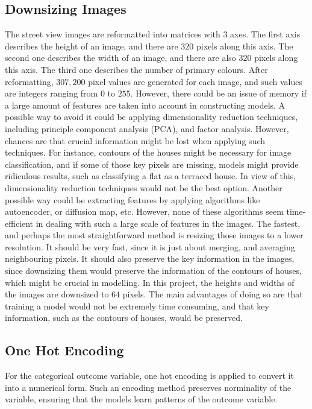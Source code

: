 \documentclass[11pt,twoside]{article}
\numberwithin{Theorem}{section}
\numberwithin{Definition}{section}
\numberwithin{Lemma}{section}
\numberwithin{Algorithm}{section}
\numberwithin{equation}{section}
\begin{document}
\subsection{Downsizing Images}
The street view images are reformatted into matrices with $3$ axes. The first axis describes the height of an image, and there are $320$ pixels along this axis. The second one describes the width of an image, and there are also $320$ pixels along this axis. The third one describes the number of primary colours. After reformatting, $307, 200$ pixel values are generated for each image, and such values are integers ranging from $0$ to $255$. However, there could be an issue of memory if a large amount of features are taken into account in constructing models. A possible way to avoid it could be applying dimensionality reduction techniques, including principle component analysis (PCA), and factor analysis. However, chances are that crucial information might be lost when applying such techniques. For instance, contours of the houses might be necessary for image classification, and if some of those key pixels are missing, models might provide ridiculous results, such as classifying a flat as a terraced house. In view of this, dimensionality reduction techniques would not be the best option. Another possible way could be extracting features by applying algorithms like autoencoder, or diffusion map, etc. However, none of these algorithms seem time-efficient in dealing with such a large scale of features in the images. The fastest, and perhaps the most straightforward method is resizing those images to a lower resolution. It should be very fast, since it is just about merging, and averaging neighbouring pixels. It should also preserve the key information in the images, since downsizing them would preserve the information of the contours of houses, which might be crucial in modelling. In this project, the heights and widths of the images are downsized to $64$ pixels. The main advantages of doing so are that training a model would not be extremely time consuming, and that key information, such as the contours of houses, would be preserved.

\subsection{One Hot Encoding}
For the categorical outcome variable, one hot encoding is applied to convert it into a numerical form. Such an encoding method preserves norminality of the variable, ensuring that the models learn patterns of the outcome variable.
\end{document}
